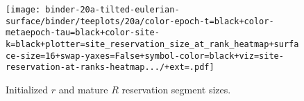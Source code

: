 \begin{figure*}[htbp!]
\begin{subfigure}{0.5\textwidth}
\texttt{[image: binder-20a-tilted-eulerian-surface/binder/teeplots/20a/color-epoch-t=black+color-metaepoch-tau=black+color-site-k=black+plotter=site\_reservation\_size\_at\_rank\_heatmap+surface-size=16+swap-yaxes=False+symbol-color=black+viz=site-reservation-at-ranks-heatmap.../+ext=.pdf]}\vspace{-1ex}
\caption{\footnotesize Initialized $r$ and mature $R$ reservation segment sizes.}
\label{fig:hsurf-stretched-intuition-reservations-size}
\end{subfigure}%
\begin{subfigure}{0.5\textwidth}~\end{subfigure}\vspace{-1ex}



\end{figure*}
